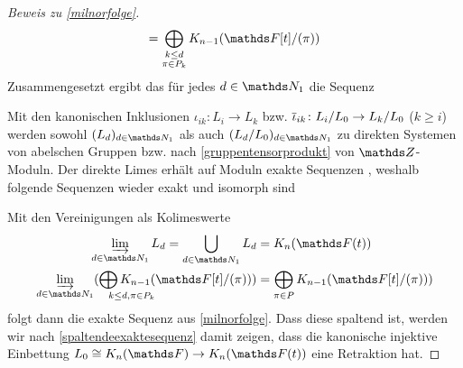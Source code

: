 \documentclass[ngerman,fontsize=11pt, paper=a4, parskip=half, titlepage=true, toc=bib]{scrartcl}
\begin{document}
\begin{proof}[Beweis zu \ref{milnorfolge}]
\begin{align}
    = \bigoplus_{\substack{k\leq d\\\pi\in P_k}}
    \K_{n-1}(\Ftpi)
  \end{align}
  Zusammengesetzt ergibt das für jedes $d\in\N_1$ die Sequenz
  \begin{center}
  \end{center}
  Mit den kanonischen Inklusionen $\iota_{ik}\colon L_i\to L_k$ 
  bzw. $\overline{\iota}_{ik}\colon L_i/L_0\to L_k/L_0$ ($k\geq i$) werden
  sowohl $(L_d)_{d\in\N_1}$ als auch $(L_d/L_0)_{d\in\N_1}$
  zu direkten Systemen von abelschen Gruppen bzw. nach
  \ref{gruppentensorprodukt} von $\Z$-Moduln.
  Der direkte Limes erhält auf Moduln exakte Sequenzen 
  \cite[siehe][III. §6.2, Prop. 3]{bourbaki},
  weshalb folgende Sequenzen wieder exakt und isomorph sind
  \begin{center}
  \end{center}
  Mit den Vereinigungen als Kolimeswerte
  \begin{align*}
    \varinjlim_{d\in\N_1}L_d
    =\bigcup_{d\in\N_1}L_d
    &=\KnFt\\
    \varinjlim_{d\in\N_1}
      (\bigoplus_{\mathrlap{k\leq d, \pi\in P_k}}
      \K_{n-1}(\Ftpi))
    &=\bigoplus_{\pi\in P}
      \K_{n-1}(\Ftpi))
  \end{align*}
  folgt dann die exakte Sequenz aus \ref{milnorfolge}.
  Dass diese spaltend ist, werden wir nach
  \ref{spaltendeexaktesequenz} damit zeigen, dass
  die kanonische injektive Einbettung $L_0\cong\KnF\to\KnFt$ 
  eine Retraktion hat.


\end{proof}
\end{document}
